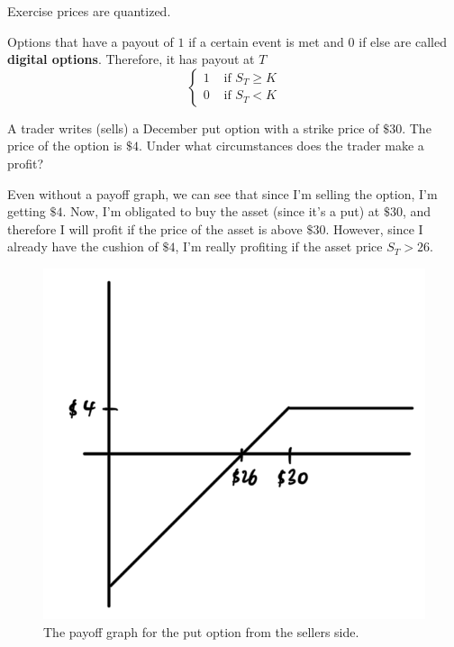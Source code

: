 \documentclass{article}
\begin{document}
      Exercise prices are quantized. 

      \begin{example}
        Options that have a payout of $1$ if a certain event is met and $0$ if else are called \textbf{digital options}. Therefore, it has payout at $T$ 
        \begin{equation}
          \begin{cases} 
            1 & \text{ if } S_T \geq K \\ 
            0 & \text{ if } S_T < K
          \end{cases} 
        \end{equation}
      \end{example}

      \begin{exercise}[Hull 1.16]
        A trader writes (sells) a December put option with a strike price of $\$30$. The price of the option is $\$4$. Under what circumstances does the trader make a profit? 
      \end{exercise}
      \begin{solution}
        Even without a payoff graph, we can see that since I'm selling the option, I'm getting $\$4$. Now, I'm obligated to buy the asset (since it's a put) at $\$30$, and therefore I will profit if the price of the asset is above $\$30$. However, since I already have the cushion of $\$4$, I'm really profiting if the asset price $S_T > 26$. 
        \begin{figure}[H]
          \centering 
          \includegraphics[scale=0.2]{img/ex1-16.png}
          \caption{The payoff graph for the put option from the sellers side.} 
          \label{fig:ex1-16}
        \end{figure}
      \end{solution}
\end{document}

